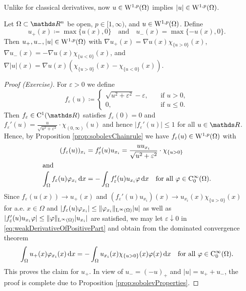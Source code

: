 Unlike for classical derivatives, now $u \in \mathrm{W}^{1,p}(\Omega)$ implies $|u| \in \mathrm{W}^{1,p}(\Omega)$.

\begin{cor}
  Let $\Omega \subset \R^n$ be open, $p \in [1,\infty)$, and $u \in \mathrm{W}^{1,p}(\Omega)$.
  Define 
  $$u_+(x) \coloneqq \max\{u(x),0\} \quad\text{and}\quad u_-(x) = \max\{-u(x),0\}.$$
  Then $u_+, u_-,|u| \in \mathrm{W}^{1,p}(\Omega)$ with
    $\nabla u_+(x) = \nabla u(x) \chi_{\{ u > 0\}}(x)$, $\nabla u_-(x) = -\nabla u(x) \chi_{\{ u < 0\}}(x)$, and $\nabla|u|(x) = \nabla u(x) \left( \chi_{\{ u > 0\} } (x) - \chi_{\{u < 0\}} (x) \right)$.
\end{cor}

\begin{proof}[Proof (Exercise)]
  For $\varepsilon > 0$ we define
  $$
  f_\varepsilon(u) \coloneqq
  \begin{cases}
    \sqrt{u^2 + \varepsilon^2} - \varepsilon, &\quad\text{if } u > 0,\\
    0, &\quad\text{if } u \leq 0.
  \end{cases}
  $$
  Then $f_\varepsilon \in \CC^1(\R)$ satisfies $f_\varepsilon(0) = 0$ and $f_\varepsilon'(u) = \frac{u}{\sqrt{u^2 + \varepsilon^2}} \cdot \chi_{(0,\infty)}(u)$ and hence $|f_\varepsilon'(u)| \leq 1$ for all $u \in \R$.
  Hence, by Proposition \ref{prop:sobolevChainrule} we have $f_\varepsilon(u) \in \mathrm{W}^{1,p}(\Omega)$ with 
  \begin{align}
    (f_\varepsilon(u))_{x_i} &= f_\varepsilon'(u) u_{x_i} = \frac{u u_{x_i}}{\sqrt{u^2 + \varepsilon^2}} \cdot \chi_{\{ u > 0\}}\nonumber\\
    \intertext{and}
    \label{eq:weakDerivativeOfPositivePart}
    \int_\Omega f_\varepsilon(u) \varphi_{x_i} \, {\operatorname{d}\!{x}}
    &= - \int_\Omega f_\varepsilon'(u) u_{x_i} \varphi \, {\operatorname{d}\!{x}} \quad\text{for all } \varphi \in \mathrm{C}_0^\infty(\Omega).
  \end{align}
  Since $f_\varepsilon(u(x)) \to u_+(x)$ and $(f_\varepsilon'(u) u_{x_i})(x) \to u_{x_i}(x)\chi_{\{u > 0\}}(x)$ for a.e. $x \in \Omega$ and $|f_\varepsilon(u)\varphi_{x_i}| \leq \| \varphi_{x_i}\|_{\mathrm{L}^\infty(\Omega)} |u|$ as well as $|f_\varepsilon'(u) u_{x_i} \varphi|\leq \|\varphi\|_{\mathrm{L}^\infty(\Omega)} |u_{x_i}|$ are satisfied, we may let $\varepsilon\downarrow 0$ in \ref{eq:weakDerivativeOfPositivePart} and obtain from the dominated convergence theorem
  $$
  \int_\Omega u_+(x) \varphi_{x_i}(x) \, {\operatorname{d}\!{x}}
  = - \int_\Omega u_{x_i}(x) \chi_{\{u > 0\}}(x) \varphi(x) \, {\operatorname{d}\!{x}} \quad\text{for all } \varphi \in \mathrm{C}_0^\infty(\Omega).
  $$
  This proves the claim for $u_+$.
  In view of $u_- = (-u)_+$ and $|u| = u_+ + u_-$, the proof is complete due to Proposition \ref{prop:sobolevProperties}.
\end{proof}

